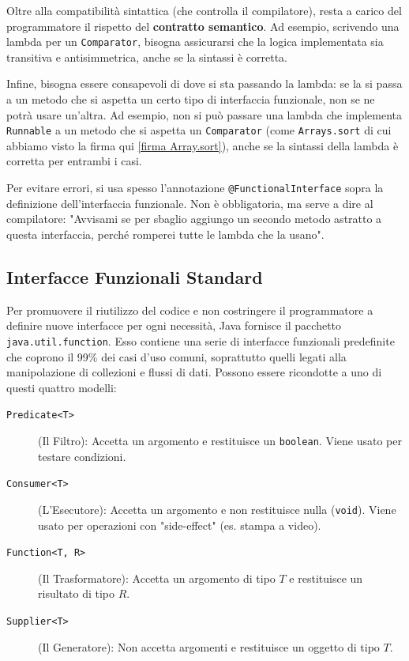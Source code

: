 Oltre alla compatibilità sintattica (che controlla il compilatore), resta a carico del programmatore il rispetto del \textbf{contratto semantico}. Ad esempio, scrivendo una lambda per un \texttt{Comparator}, bisogna assicurarsi che la logica implementata sia transitiva e antisimmetrica, anche se la sintassi è corretta.

 Infine, bisogna essere consapevoli di dove si sta passando la lambda: se la si passa a un metodo che si aspetta un certo tipo di interfaccia funzionale, non se ne potrà usare un'altra. Ad esempio, non si può passare una lambda che implementa \texttt{Runnable} a un metodo che si aspetta un \texttt{Comparator} (come \texttt{Arrays.sort} di cui abbiamo visto la firma qui \ref{firma Array.sort}), anche se la sintassi della lambda è corretta per entrambi i casi.

\begin{tip}
Per evitare errori, si usa spesso l'annotazione \texttt{@FunctionalInterface} sopra la definizione dell'interfaccia funzionale. Non è obbligatoria, ma serve a dire al compilatore: "Avvisami se per sbaglio aggiungo un secondo metodo astratto a questa interfaccia, perché romperei tutte le lambda che la usano".
\end{tip}

\subsection{Interfacce Funzionali Standard}

Per promuovere il riutilizzo del codice e non costringere il programmatore a definire nuove interfacce per ogni necessità, Java fornisce il pacchetto \texttt{java.util.function}. Esso contiene una serie di interfacce funzionali predefinite che coprono il 
99\% dei casi d'uso comuni, soprattutto quelli legati alla manipolazione di collezioni e flussi di dati. Possono essere ricondotte a uno di questi quattro modelli:

\begin{description}
    \item[\texttt{Predicate<T>}] (Il Filtro): Accetta un argomento e restituisce un \texttt{boolean}. Viene usato per testare condizioni.
    \item[\texttt{Consumer<T>}] (L'Esecutore): Accetta un argomento e non restituisce nulla (\texttt{void}). Viene usato per operazioni con "side-effect" (es. stampa a video).
    \item[\texttt{Function<T, R>}] (Il Trasformatore): Accetta un argomento di tipo $T$ e restituisce un risultato di tipo $R$. 
    \item[\texttt{Supplier<T>}] (Il Generatore): Non accetta argomenti e restituisce un oggetto di tipo $T$.
\end{description}
\vspace{\baselineskip}

